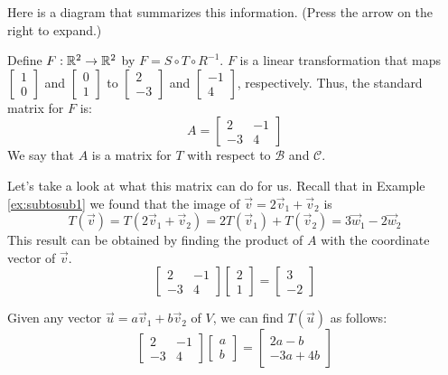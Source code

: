 \documentclass{ximera}
\begin{document}
\begin{exploration}
\begin{expandable}
\begin{center}
\end{center}
\end{expandable}

Here is a diagram that summarizes this information.  (Press the arrow on the right to expand.)

Define $F:\mathbb{R}^2\rightarrow \mathbb{R}^2$ by $F=S\circ T\circ R^{-1}$.  $F$ is a linear transformation that maps $\begin{bmatrix}1\\0\end{bmatrix}$ and $\begin{bmatrix}0\\1\end{bmatrix}$ to $\begin{bmatrix}2\\-3\end{bmatrix}$ and $\begin{bmatrix}-1\\4\end{bmatrix}$, respectively.  Thus, the standard matrix for $F$ is:
$$A=\begin{bmatrix}2&-1\\-3&4\end{bmatrix}$$
We say that $A$ is a matrix for $T$ with respect to $\mathcal{B}$ and $\mathcal{C}$.  

Let's take a look at what this matrix can do for us.  Recall that in Example \ref{ex:subtosub1} we found that the image of $\vec{v}=2\vec{v}_1+\vec{v}_2$ is $$T(\vec{v})=T(2\vec{v}_1+\vec{v}_2)=2T(\vec{v}_1)+T(\vec{v}_2)=3\vec{w}_1-2\vec{w}_2$$
This result can be obtained by finding the product of $A$ with the coordinate vector of  $\vec{v}$.
$$\begin{bmatrix}2&-1\\-3&4\end{bmatrix}\begin{bmatrix}2\\1\end{bmatrix}=\begin{bmatrix}3\\-2\end{bmatrix}$$

Given any vector $\vec{u}=a\vec{v}_1+b\vec{v}_2$ of $V$, we can find $T(\vec{u})$ as follows:
$$\begin{bmatrix}2&-1\\-3&4\end{bmatrix}\begin{bmatrix}a\\b\end{bmatrix}=\begin{bmatrix}2a-b\\-3a+4b\end{bmatrix}$$


\end{exploration}
\end{document}
